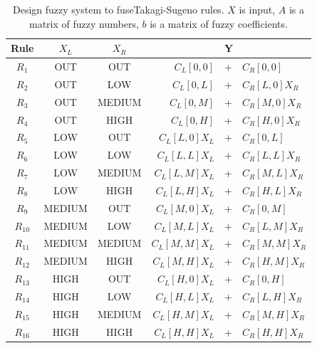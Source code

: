 \begin{table}[h!]
\begin{center}
\begin{tabular}{|c|c c|rcl|} \hline
\textbf{Rule}   & \textbf{$X_L$}  & \textbf{$X_R$}  & \multicolumn{3}{|c|}{\textbf{Y}}  \\ \hline
$R_1$           & OUT             & OUT             & $C_{L}[0,0]    $&+&$ C_{R}[0,0]   $   \\ \hline
$R_2$           & OUT             & LOW             & $C_{L}[0,L]    $&+&$ C_{R}[L,0]X_R$   \\ \hline
$R_3$           & OUT             & MEDIUM          & $C_{L}[0,M]    $&+&$ C_{R}[M,0]X_R$   \\ \hline
$R_4$           & OUT             & HIGH            & $C_{L}[0,H]    $&+&$ C_{R}[H,0]X_R$   \\ \hline
$R_5$           & LOW             & OUT             & $C_{L}[L,0]X_L $&+&$ C_{R}[0,L]   $   \\ \hline
$R_6$           & LOW             & LOW             & $C_{L}[L,L]X_L $&+&$ C_{R}[L,L]X_R$   \\ \hline
$R_7$           & LOW             & MEDIUM          & $C_{L}[L,M]X_L $&+&$ C_{R}[M,L]X_R$   \\ \hline
$R_8$           & LOW             & HIGH            & $C_{L}[L,H]X_L $&+&$ C_{R}[H,L]X_R$   \\ \hline
$R_9$           & MEDIUM          & OUT             & $C_{L}[M,0]X_L $&+&$ C_{R}[0,M]$      \\ \hline
$R_{10}$        & MEDIUM          & LOW             & $C_{L}[M,L]X_L $&+&$ C_{R}[L,M]X_R$   \\ \hline
$R_{11}$        & MEDIUM          & MEDIUM          & $C_{L}[M,M]X_L $&+&$ C_{R}[M,M]X_R$   \\ \hline
$R_{12}$        & MEDIUM          & HIGH            & $C_{L}[M,H]X_L $&+&$ C_{R}[H,M]X_R$   \\ \hline
$R_{13}$        & HIGH            & OUT             & $C_{L}[H,0]X_L $&+&$ C_{R}[0,H]   $   \\ \hline
$R_{14}$        & HIGH            & LOW             & $C_{L}[H,L]X_L $&+&$ C_{R}[L,H]X_R$   \\ \hline
$R_{15}$        & HIGH            & MEDIUM          & $C_{L}[H,M]X_L $&+&$ C_{R}[M,H]X_R$   \\ \hline
$R_{16}$        & HIGH            & HIGH            & $C_{L}[H,H]X_L $&+&$ C_{R}[H,H]X_R$   \\ \hline
\end{tabular}
\caption{Design fuzzy system to fuseTakagi-Sugeno rules. $X$ is input, $A$ is a matrix of fuzzy numbers, $b$ is a matrix of fuzzy coefficients.\label{table:fuzzyfusion} \cite{InsightIntoFuzzyModelling}}
\end{center}
\end{table}

